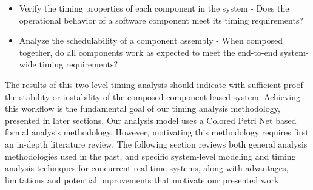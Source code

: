 \begin{itemize}
	\item Verify the timing properties of each component in the system - Does the operational behavior of a software component meet its timing requirements?
	
	\item Analyze the schedulability of a component assembly - When composed together, do all components work as expected to meet the end-to-end system-wide timing requirements?
\end{itemize}

The results of this two-level timing analysis should indicate with sufficient proof the stability or instability of the composed component-based system. Achieving this workflow is the fundamental goal of our timing analysis methodology, presented in later sections. Our analysis model uses a Colored Petri Net \cite{CPN} based formal analysis methodology. However, motivating this methodology requires first an in-depth literature review. The following section reviews both general analysis methodologies used in the past, and specific system-level modeling and timing analysis techniques for concurrent real-time systems, along with advantages, limitations and potential improvements that motivate our presented work.

\fi